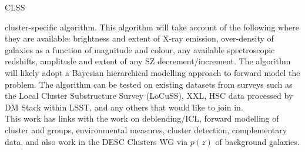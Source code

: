 \begin{tasklist}{CLSS}
\begin{task}
{cluster-specific algorithm. This algorithm will take account of the
following where they are available: brightness and extent of X-ray
emission, over-density of galaxies as a function of magnitude and
colour, any available spectroscopic redshifts, amplitude and extent of
any SZ decrement/increment. The algorithm will likely adopt a Bayesian
hierarchical modelling approach to forward model the problem.  The
algorithm can be tested on existing datasets from surveys such as the
Local Cluster Substructure Survey (LoCuSS), XXL, HSC data processed by
DM Stack within LSST, and any others that would like to join in.
\\
This work has links with the work on deblending/ICL, forward modelling
of cluster and groups, environmental measures, cluster detection,
complementary data, and also work in the DESC Clusters WG via $p(z)$
of background galaxies.}
\end{task}




\end{tasklist}
